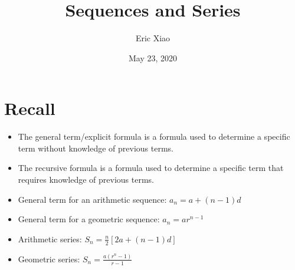 \documentclass[12pt]{extarticle}
\title{Sequences and Series}
\author{Eric Xiao}
\date{May 23, 2020}
\begin{document}
\maketitle

\section{Recall}
\begin{itemize}
    \item {The general term/explicit formula is a formula used to determine a specific term without knowledge of previous terms.}
    \item {The recursive formula is a formula used to determine a specific term that requires knowledge of previous terms.}
    \item {General term for an arithmetic sequence: $a_n = a + (n - 1)d$}
    \item {General term for a geometric sequence: $a_n = ar^{n-1}$}
    \item {Arithmetic series: $S_n = \frac{n}{2}[2a + (n - 1)d]$}
    \item {Geometric series: $S_n = \frac{a(r^n - 1)}{r - 1}$}
\end{itemize}
\end{document}

